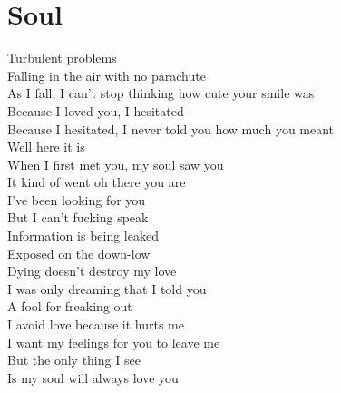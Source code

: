 \documentclass[12pt, b5paper]{article}
\begin{document}
\section{Soul}
Turbulent problems 
\\Falling in the air with no parachute 
\\As I fall, I can’t stop thinking how cute your smile was
\\Because I loved you, I hesitated
\\Because I hesitated, I never told you how much you meant
\\Well here it is 
\\When I first met you, my soul saw you
\\It kind of went oh there you are 
\\I’ve been looking for you
\\But I can’t fucking speak
\\Information is being leaked
\\Exposed on the down-low 
\\Dying doesn't destroy my love 
\\I was only dreaming that I told you
\\A fool for freaking out 
\\I avoid love because it hurts me
\\I want my feelings for you to leave me 
\\But the only thing I see 
\\Is my soul will always love you

\newpage 
\end{document}
